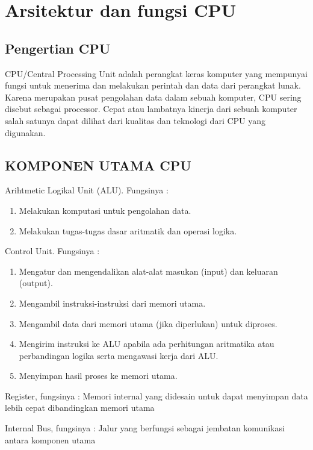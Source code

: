 \section{Arsitektur dan fungsi CPU}
\subsection{Pengertian CPU} 
CPU/Central Processing Unit adalah perangkat keras komputer yang mempunyai fungsi untuk menerima dan melakukan perintah dan data dari perangkat lunak. Karena merupakan pusat pengolahan data dalam sebuah komputer, CPU sering disebut sebagai processor. Cepat atau lambatnya kinerja dari sebuah komputer salah satunya dapat dilihat dari kualitas dan teknologi dari CPU yang digunakan.

\subsection{KOMPONEN UTAMA CPU}
Arihtmetic Logikal Unit (ALU). Fungsinya :
\begin{enumerate}
\item Melakukan komputasi untuk pengolahan data.
\item Melakukan tugas-tugas dasar aritmatik dan operasi logika.
\end{enumerate}

Control Unit. Fungsinya : 
\begin{enumerate}
\item  Mengatur dan mengendalikan alat-alat masukan (input) dan keluaran (output).
\item Mengambil instruksi-instruksi dari memori utama.
\item Mengambil data dari memori utama (jika diperlukan) untuk diproses.
\item Mengirim instruksi ke ALU apabila ada perhitungan aritmatika atau perbandingan logika serta mengawasi kerja dari ALU.
\item Menyimpan hasil proses ke memori utama.
\end{enumerate}

Register, fungsinya :
Memori internal yang didesain untuk dapat menyimpan data lebih cepat dibandingkan memori utama

Internal Bus, fungsinya :
Jalur yang berfungsi sebagai jembatan komunikasi antara komponen utama



